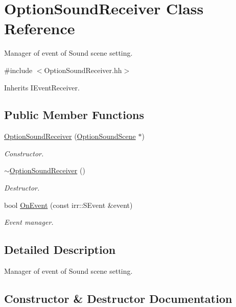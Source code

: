 \hypertarget{classOptionSoundReceiver}{}\section{Option\+Sound\+Receiver Class Reference}
\label{classOptionSoundReceiver}


Manager of event of Sound scene setting.  




{\ttfamily \#include $<$Option\+Sound\+Receiver.\+hh$>$}



Inherits I\+Event\+Receiver.

\subsection*{Public Member Functions}
\begin{DoxyCompactItemize}
\item 
\hyperlink{classOptionSoundReceiver_aac72bf7db0c7610a37f9f14984f087ef}{Option\+Sound\+Receiver} (\hyperlink{classOptionSoundScene}{Option\+Sound\+Scene} $\ast$)
\begin{DoxyCompactList}\small\item\em Constructor. \end{DoxyCompactList}\item 
\hyperlink{classOptionSoundReceiver_aca3553e7a1777ed7e39111325b09954a}{$\sim$\+Option\+Sound\+Receiver} ()
\begin{DoxyCompactList}\small\item\em Destructor. \end{DoxyCompactList}\item 
bool \hyperlink{classOptionSoundReceiver_ae7c9643b12df38a45d4e3d629274019c}{On\+Event} (const irr\+::\+S\+Event \&event)
\begin{DoxyCompactList}\small\item\em Event manager. \end{DoxyCompactList}\end{DoxyCompactItemize}


\subsection{Detailed Description}
Manager of event of Sound scene setting. 

\subsection{Constructor \& Destructor Documentation}
\mbox{\label{classOptionSoundReceiver_aac72bf7db0c7610a37f9f14984f087ef}} 
